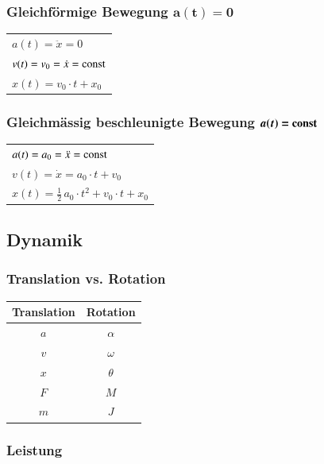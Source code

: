 \subsubsection{Gleichförmige Bewegung $\bm{a(t) = 0}$}

\renewcommand{\arraystretch}{1.3}
\begin{tabular}{l}
	$a(t) = \ddot{x} = 0$ 			\\
	$v(t) = v_0 = \dot{x} = \mathrm{const}$ \\
	$x(t) = v_0 \cdot t + x_0$
\end{tabular}
\renewcommand{\arraystretch}{1}
		
		
\subsubsection{Gleichmässig beschleunigte Bewegung $\bm{a(t) = \mathrm{const}}$}

\renewcommand{\arraystretch}{1.3}
\begin{tabular}{l}
	$a(t) = a_0 = \ddot{x} = \mathrm{const}$ 							\\
	$v(t) =  \dot{x} = a_0 \cdot t + v_0$ 						\\
	$x(t) = \frac{1}{2} \, a_0 \cdot t^2 + v_0 \cdot t + x_0$
\end{tabular}
\renewcommand{\arraystretch}{1}
	

\subsection{Dynamik}

\subsubsection{Translation vs. Rotation}
\renewcommand{\arraystretch}{1.2}
\begin{tabular}{| c | c |}
	\hline
	\textbf{Translation} 	& \textbf{Rotation}	\\
	\hline
	$a$ 					& $\alpha$ 			\\
	\hline
	$v$ 					& $\omega$ 			\\
	\hline
	$x$ 					& $\theta$ 			\\
	\hline
	$F$ 					& $M$ 				\\
	\hline
	$m$ 					& $J$ 				\\
	\hline
\end{tabular}
\renewcommand{\arraystretch}{1}


\subsubsection{Leistung}


